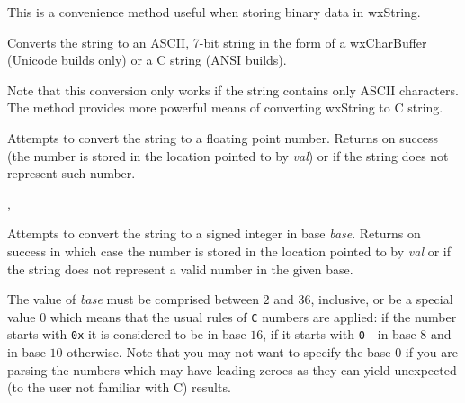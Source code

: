 This is a convenience method useful when storing binary data in wxString.





\label{wxstringtoascii}



Converts the string to an ASCII, 7-bit string in the form of
a wxCharBuffer (Unicode builds only) or a C string (ANSI builds).

Note that this conversion only works if the string contains only ASCII
characters. The  method provides more
powerful means of converting wxString to C string.


\label{wxstringtodouble}


Attempts to convert the string to a floating point number. Returns \true on
success (the number is stored in the location pointed to by {\it val}) or \false
if the string does not represent such number.


,\\


\label{wxstringtolong}


Attempts to convert the string to a signed integer in base {\it base}. Returns
\true on success in which case the number is stored in the location
pointed to by {\it val} or \false if the string does not represent a
valid number in the given base.

The value of {\it base} must be comprised between $2$ and $36$, inclusive, or
be a special value $0$ which means that the usual rules of {\tt C} numbers are
applied: if the number starts with {\tt 0x} it is considered to be in base
$16$, if it starts with {\tt 0} - in base $8$ and in base $10$ otherwise. Note
that you may not want to specify the base $0$ if you are parsing the numbers
which may have leading zeroes as they can yield unexpected (to the user not
familiar with C) results.

